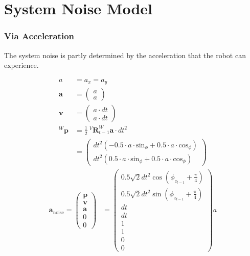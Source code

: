 \documentclass{article}
\newcommand{\Rotation}[3]{^{#1}\textbf{R}^{#2}_{#3}}
\newcommand{\Position}[2]{^{#1}\textbf{p}_{#2}}
\begin{document}
\section{System Noise Model}
\subsubsection{Via Acceleration}

The system noise is partly determined by the acceleration that the robot can experience.

\begin{align}
  a &= a_x = a_y \\
  \textbf{a} &= \left(\begin{matrix}a\\a\end{matrix}\right) \\
  \textbf{v} &= \left(\begin{matrix}a \cdot dt\\a \cdot dt\end{matrix}\right) \\
  \Position{W}{} &= \frac{1}{2}\ \Rotation{V}{W}{t-1}\textbf{a} \cdot dt^2 \\ 
  &= \left(\begin{matrix}dt^{2} \left(- 0.5 \cdot a \cdot \textrm{sin}_\phi + 0.5 \cdot a \cdot \textrm{cos}_\phi\right)\\dt^{2} \left(0.5 \cdot a \cdot \textrm{sin}_\phi + 0.5 \cdot a \cdot \textrm{cos}_\phi\right)\end{matrix}\right)
\end{align}
\begin{align}
  \textbf{a}_{\textrm{noise}} =
  \left(\begin{matrix}
    \textbf{p} \\
    \textbf{v} \\
    \textbf{a} \\
    0 \\
    0
  \end{matrix}\right)
&=\left(\begin{matrix}0.5 \sqrt{2} dt^{2} \cos{\left(\phi_{z_{t-1}} + \frac{\pi}{4} \right)}\\0.5 \sqrt{2} dt^{2} \sin{\left(\phi_{z_{t-1}} + \frac{\pi}{4} \right)}\\dt\\dt\\1\\1\\0\\0\end{matrix}\right) a
\end{align}
\end{document}
